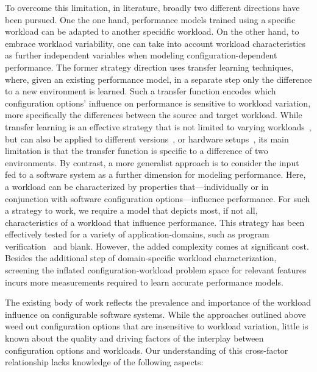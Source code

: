 To overcome this limitation, in literature, broadly two different directions have been pursued. One the one hand, performance models trained using a specific workload can be adapted to another specidfic workload. On the other hand, to embrace worklaod variability, one can take into account workload characteristics as further independent variables when modeling configuration-dependent performance.
The former strategy direction uses transfer learning techniques, where, given an existing performance model, in a separate step only the difference to a new environment is learned. Such a transfer function encodes which configuration options’ influence on performance is sensitive to workload variation, more specifically the differences between the source and target workload. While transfer learning is an effective strategy that is not limited to varying workloads~\cite{jamshidi_learning_2018}, but can also be applied to different versions~\cite{jamishidi_transfer_2017,jamshidi_transfer_gp_2017,martin_transfer_2021}, or hardware setups~\cite{}, its main limitation is that the transfer function is specific to a difference of two environments.
By contrast, a more generalist approach is to consider the input fed to a software system as a further dimension for modeling performance. Here, a workload can be characterized by properties that---individually or in conjunction with software configuration options---influence performance. For such a strategy to work, we require a model that depicts most, if not all, characteristics of a workload that influence performance. This strategy has been effectively tested for a  variety of application-domains, such as program verification~\cite{koc_satune_2021} and {\color{red}blank}. However, the added complexity comes at significant cost. Besides the additional step of domain-specific workload characterization, screening the inflated configuration-workload problem space for relevant features incurs more measurements required to learn accurate performance models.  

The existing body of work reflects the prevalence and importance of the workload influence on configurable software systems. While the approaches outlined above weed out configuration options that are insensitive to workload variation, little is known about the quality and driving factors of the interplay between configuration options and workloads. Our understanding of this cross-factor relationship lacks knowledge of the following aspects:

